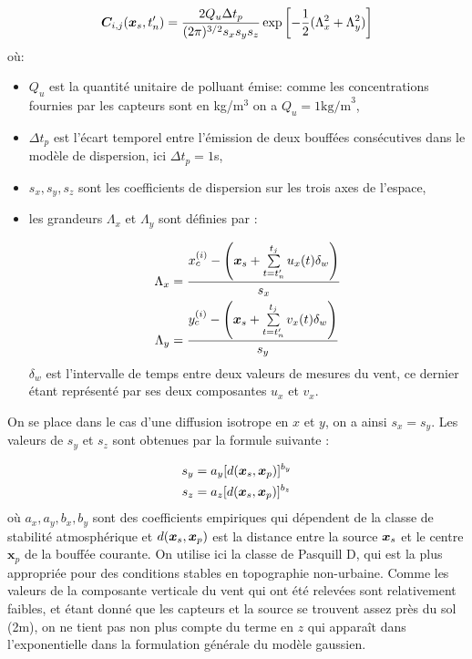  \begin{equation}
 {\bm{C}}_{i,j}({\bm{x}_s}, t'_n) = \dfrac{2Q_u\Delta t_p}{(2\pi)^{3/2}s_x s_y s_z}\exp\left[-\dfrac{1}{2}(\Lambda_x^2 + \Lambda_y^2)\right]
 \label{eq_AE_27}
 \end{equation}
 où:
 \begin{itemize}
 	\item $Q_u$ est la quantité unitaire de polluant émise: comme les concentrations fournies par les capteurs sont en kg/m$^3$ on a $Q_u = 1\text{kg/m}^3$,
 	\item $\Delta t_p$ est l'écart temporel entre l'émission de deux bouffées consécutives dans le modèle de dispersion, ici $\Delta t_p = 1$s,
 	\item $s_x, s_y, s_z$ sont les coefficients de dispersion sur les trois axes de l'espace,
 	\item les grandeurs $\Lambda_x$ et $\Lambda_y$ sont définies par : 
 	
 	\begin{equation}
 	\begin{split}
 	\Lambda_x &= \dfrac{x_c^{(i)} - \left({\bm{x}_s} + \sum\limits_{t=t'_n}^{t_j}u_x(t)\delta_w\right)}{s_x}\\
 	 	\Lambda_y &= \dfrac{y_c^{(i)} - \left({\bm{x}_s} + \sum\limits_{t=t'_n}^{t_j}v_x(t)\delta_w\right)}{s_y}
 	\end{split}
 	\end{equation}
 	$\delta_w$ est l'intervalle de temps entre deux valeurs de mesures du vent, ce dernier étant représenté par ses deux composantes $u_x$ et $v_x$.
 \end{itemize}
 
 On se place dans le cas d'une diffusion isotrope en $x$ et $y$, on a ainsi $s_x = s_y$. Les valeurs de $s_y$ et $s_z$ sont obtenues par la formule suivante : 
 
 \begin{equation}
 \begin{split}
 s_y &= a_y [d({\bm{x}_s}, \bm{x}_p)]^{b_y}\\
 s_z &= a_z [d({\bm{x}_s}, \bm{x}_p)]^{b_z}
 \end{split}
 \end{equation}
 où $a_x, a_y, b_x, b_y$ sont des coefficients empiriques qui dépendent de la classe de stabilité atmosphérique \cite{Pasquill1983} et $d({\bm{x}_s}, \bm{x}_p)$ est la distance entre la source ${\bm{x}_s}$ et le centre $\bm{x}_p$ de la bouffée courante. On utilise ici la classe de Pasquill D, qui est la plus appropriée pour des conditions stables en topographie non-urbaine. 
 Comme les valeurs de la composante verticale du vent qui ont été relevées sont relativement faibles, et étant donné que les capteurs et la source se trouvent assez près du sol (2m), on ne tient pas non plus compte du terme en $z$ qui apparaît dans l'exponentielle dans la formulation générale du modèle gaussien. 


